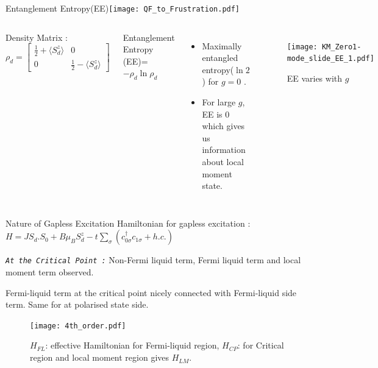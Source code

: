 \documentclass{beamer}
\begin{document}
\begin{frame}{Entanglement Entropy(EE){\hfill\texttt{[image: QF\_to\_Frustration.pdf]}\hfill}}
\begin{columns}[T,onlytextwidth]
\begin{exampleblock}{Density Matrix : }
$
\rho_d =\begin{bmatrix}
\frac{1}{2} + \langle S_d^z \rangle & 0 \\
0 & \frac{1}{2} - \langle S_d^z \rangle
\end{bmatrix}
$
\end{exampleblock}
\begin{exampleblock}{Entanglement Entropy}
 (EE)= $ -\rho_d \ln \rho_d$
 \end{exampleblock}
\begin{itemize}
\item Maximally entangled entropy($\ln 2$) for $g = 0$ . 
\item For large $g$, EE is $0$ which gives us information about local moment state. 
\end{itemize}

\begin{figure}[!ht]
    \centering
    \texttt{[image: KM\_Zero1-mode\_slide\_EE\_1.pdf]}
    \caption{{\small EE varies with $g$}}
\end{figure}
\end{columns}
\end{frame}


\begin{frame}{Nature of Gapless Excitation}
Hamiltonian for gapless excitation : $H = J S_d. S_0  + B \mu_B S_d^z -t \sum_\sigma (c_{0\sigma}^\dagger c_{1\sigma} + h.c.) $

\begin{alertblock}{\texttt{\textit{At the Critical Point :}}}
 Non-Fermi liquid term, Fermi liquid term and local moment term observed.
\end{alertblock}
Fermi-liquid term at the critical point nicely connected with Fermi-liquid side term. Same for at polarised state side.

\begin{figure}[!ht]
    \centering
    \texttt{[image: 4th\_order.pdf]}
    \caption{$H_{FL}$: effective Hamiltonian for Fermi-liquid region, $H_{CP}$: for Critical region and local moment region gives $H_{LM}$.}
    \label{olkh}
\end{figure}
\end{frame}
\end{document}

